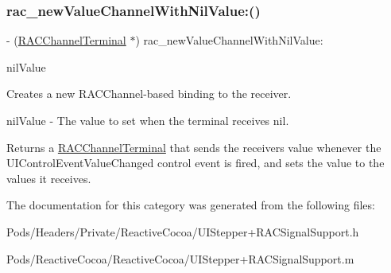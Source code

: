 \subsubsection{\texorpdfstring{rac\+\_\+new\+Value\+Channel\+With\+Nil\+Value\+:()}{rac\_newValueChannelWithNilValue:()}\hspace{0.1cm}{\footnotesize\ttfamily [3/3]}}
{\footnotesize\ttfamily -\/ (\mbox{\hyperlink{interface_r_a_c_channel_terminal}{R\+A\+C\+Channel\+Terminal}} $\ast$) rac\+\_\+new\+Value\+Channel\+With\+Nil\+Value\+: \begin{DoxyParamCaption}\item[{(N\+S\+Number $\ast$)}]{nil\+Value }\end{DoxyParamCaption}}

Creates a new R\+A\+C\+Channel-\/based binding to the receiver.

nil\+Value -\/ The value to set when the terminal receives {\ttfamily nil}.

Returns a \mbox{\hyperlink{interface_r_a_c_channel_terminal}{R\+A\+C\+Channel\+Terminal}} that sends the receiver\textquotesingle{}s value whenever the U\+I\+Control\+Event\+Value\+Changed control event is fired, and sets the value to the values it receives. 

The documentation for this category was generated from the following files\+:\begin{DoxyCompactItemize}
\item 
Pods/\+Headers/\+Private/\+Reactive\+Cocoa/U\+I\+Stepper+\+R\+A\+C\+Signal\+Support.\+h\item 
Pods/\+Reactive\+Cocoa/\+Reactive\+Cocoa/U\+I\+Stepper+\+R\+A\+C\+Signal\+Support.\+m\end{DoxyCompactItemize}
